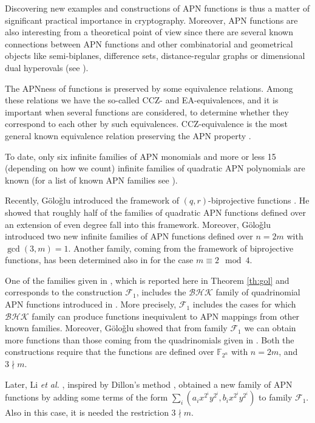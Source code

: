 \documentclass{article}
\newcommand{\cF}{\mathcal{F}}
\begin{document}
Discovering new examples and constructions of APN functions is thus a matter of significant practical importance in cryptography. 
Moreover, APN functions are also interesting from a theoretical point of view since there are several known connections between APN functions and other combinatorial and geometrical objects like semi-biplanes, difference sets, distance-regular graphs or dimensional dual hyperovals (see \cite{CGT16,CH99,DO68,DE14}).

The APNness of functions is preserved by some equivalence relations. Among these relations we have the so-called CCZ- and EA-equivalences, and it is important when several functions are considered, to determine whether they correspond to each other by such equivalences. 
CCZ-equivalence is the most general known equivalence relation preserving the APN property \cite{ccz}. 

To date, only six infinite families of APN monomials and more or less 15 (depending on how we count) infinite families of quadratic APN polynomials are known  (for a list of known APN families see \cite{CBC21}).

Recently, G\"olo\v{g}lu introduced the framework of $(q,r)$-biprojective functions \cite{GOLOGLU}. He showed that roughly half of the families of quadratic APN functions defined over an extension of even degree fall into this framework. Moreover, G\"olo\v{g}lu  introduced two new infinite families of APN functions defined over $n=2m$ with $\gcd(3,m)=1$.
Another family, coming from the framework of biprojective functions, has been determined also in \cite{golkol} for the case $m\equiv 2\mod 4$.

One of the families given in \cite{GOLOGLU}, which is reported here in Theorem \ref{th:gol} and corresponds to the construction $\cF_1$, includes the $\mathcal{BHK}$ family of quadrinomial APN functions introduced in \cite{BHK}. More precisely, $\cF_1$ includes the cases for which $\mathcal{BHK}$ family can produce functions inequivalent to APN mappings from other known families.
Moreover, G\"olo\v{g}lu showed that from family $\cF_1$ we can obtain more functions than those coming from the quadrinomials given in \cite{BHK}. Both the constructions require that the functions are defined over $\mathbb{F}_{2^n}$ with $n=2m$, and $3\nmid m$.

Later, Li \emph{et al.} \cite{LZLQ}, inspired by Dillon's method \cite{dillon}, obtained a new family of APN functions by adding some terms of the form $\sum_i(a_ix^{2^i}y^{2^i},b_ix^{2^i}y^{2^i})$ to family $\mathcal{F}_1$. Also in this case, it is needed the restriction $3\nmid m$.
\end{document}
